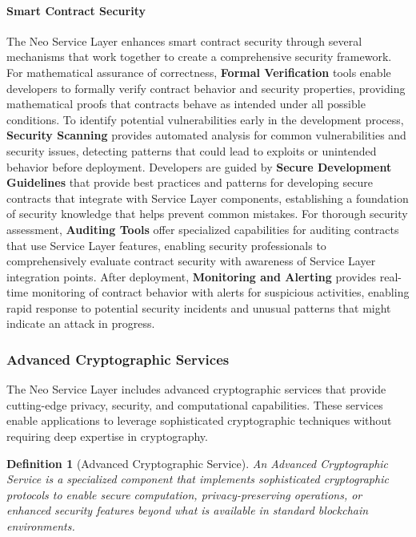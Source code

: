 \documentclass[11pt]{article}
\newtheorem{definition}{Definition}
\begin{document}
\paragraph{Smart Contract Security}
The Neo Service Layer enhances smart contract security through several mechanisms that work together to create a comprehensive security framework. For mathematical assurance of correctness, \textbf{Formal Verification} tools enable developers to formally verify contract behavior and security properties, providing mathematical proofs that contracts behave as intended under all possible conditions. To identify potential vulnerabilities early in the development process, \textbf{Security Scanning} provides automated analysis for common vulnerabilities and security issues, detecting patterns that could lead to exploits or unintended behavior before deployment. Developers are guided by \textbf{Secure Development Guidelines} that provide best practices and patterns for developing secure contracts that integrate with Service Layer components, establishing a foundation of security knowledge that helps prevent common mistakes. For thorough security assessment, \textbf{Auditing Tools} offer specialized capabilities for auditing contracts that use Service Layer features, enabling security professionals to comprehensively evaluate contract security with awareness of Service Layer integration points. After deployment, \textbf{Monitoring and Alerting} provides real-time monitoring of contract behavior with alerts for suspicious activities, enabling rapid response to potential security incidents and unusual patterns that might indicate an attack in progress.

\subsubsection{Advanced Cryptographic Services}
\label{subsubsec:advanced-crypto}

The Neo Service Layer includes advanced cryptographic services that provide cutting-edge privacy, security, and computational capabilities. These services enable applications to leverage sophisticated cryptographic techniques without requiring deep expertise in cryptography.



\begin{definition}[Advanced Cryptographic Service]
An Advanced Cryptographic Service is a specialized component that implements sophisticated cryptographic protocols to enable secure computation, privacy-preserving operations, or enhanced security features beyond what is available in standard blockchain environments.
\end{definition}
\end{document}
